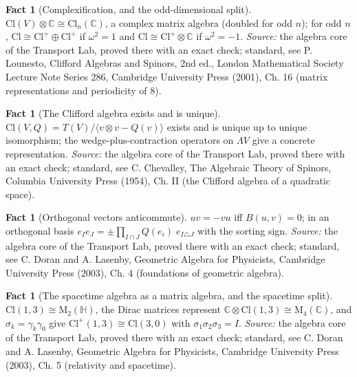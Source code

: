 \documentclass[11pt]{article}
\theoremstyle{definition}
\newtheorem{fact}[theorem]{Fact}
\theoremstyle{plain}
\providecommand{\C}{}\renewcommand{\C}{\mathbb{C}}
\providecommand{\Cl}{}\renewcommand{\Cl}{\mathrm{Cl}}
\providecommand{\HH}{}\renewcommand{\HH}{\mathbb{H}}
\providecommand{\Mat}{}\renewcommand{\Mat}{\mathrm{M}}
\begin{document}
\begin{fact}[Complexification, and the odd-dimensional split]\label{c:std-algebra.complexification}
$\Cl(V) \otimes \C \cong \Cl_n(\C)$, a complex matrix algebra (doubled for odd $n$); for odd $n$, $\Cl \cong \Cl^{+} \oplus \Cl^{+}$ if $\omega^{2} = 1$ and $\Cl \cong \Cl^{+} \otimes \C$ if $\omega^{2} = -1$.
\emph{Source:} the algebra core of the Transport Lab, proved there with an exact check; standard, see P. Lounesto, Clifford Algebras and Spinors, 2nd ed., London Mathematical Society Lecture Note Series 286, Cambridge University Press (2001), Ch. 16 (matrix representations and periodicity of 8).
\end{fact}

\begin{fact}[The Clifford algebra exists and is unique]\label{c:std-algebra.existence-uniqueness}
$\Cl(V, Q) = T(V)/\langle v \otimes v - Q(v) \rangle$ exists and is unique up to unique isomorphism; the wedge-plus-contraction operators on $\Lambda V$ give a concrete representation.
\emph{Source:} the algebra core of the Transport Lab, proved there with an exact check; standard, see C. Chevalley, The Algebraic Theory of Spinors, Columbia University Press (1954), Ch. II (the Clifford algebra of a quadratic space).
\end{fact}

\begin{fact}[Orthogonal vectors anticommute]\label{c:std-algebra.orthogonal-anticommute}
$uv = -vu$ iff $B(u,v) = 0$; in an orthogonal basis $e_I e_J = \pm \prod_{I \cap J} Q(e_i)\; e_{I \triangle J}$ with the sorting sign.
\emph{Source:} the algebra core of the Transport Lab, proved there with an exact check; standard, see C. Doran and A. Lasenby, Geometric Algebra for Physicists, Cambridge University Press (2003), Ch. 4 (foundations of geometric algebra).
\end{fact}

\begin{fact}[The spacetime algebra as a matrix algebra, and the spacetime split]\label{c:std-algebra.sta-matrix}
$\Cl(1,3) \cong \Mat_2(\HH)$, the Dirac matrices represent $\C \otimes \Cl(1,3) \cong \Mat_4(\C)$, and $\sigma_k = \gamma_k\gamma_0$ give $\Cl^{+}(1,3) \cong \Cl(3,0)$ with $\sigma_1\sigma_2\sigma_3 = I$.
\emph{Source:} the algebra core of the Transport Lab, proved there with an exact check; standard, see C. Doran and A. Lasenby, Geometric Algebra for Physicists, Cambridge University Press (2003), Ch. 5 (relativity and spacetime).
\end{fact}
\end{document}
